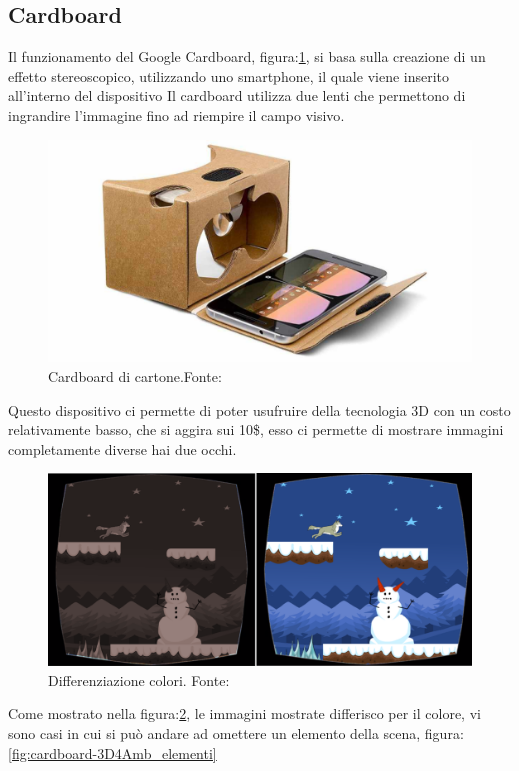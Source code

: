 \documentclass[
a4paper,
cleardoublepage=empty,
headings=twolinechapter,
numbers=autoenddot,
]{scrbook}
\begin{document}
	\subsection{Cardboard}\label{chap:cardboard}
    Il funzionamento del Google Cardboard, figura:\ref{fig:cardboard}, si basa sulla creazione di un effetto stereoscopico\cite{Stereoscopio}, utilizzando uno smartphone, il quale viene inserito all'interno del dispositivo
	Il cardboard utilizza due lenti che permettono di ingrandire l'immagine fino ad riempire il campo visivo\cite{Funzionamento_cardboard}.
	\begin{figure}[H]
		\centering
		\includegraphics[width=0.8\linewidth]{image/cardboard}
		\caption{Cardboard di cartone.Fonte:\cite{Cardboard_image}}
		\label{fig:cardboard}
	\end{figure}
	Questo dispositivo ci permette di poter usufruire della tecnologia 3D con un costo relativamente basso, che si aggira sui 10\$, esso ci permette di mostrare immagini completamente diverse hai due occhi.
	\begin{figure}[H]
		\centering
		\includegraphics[width=0.8\linewidth]{image/3D4Amb_1}
		\caption{Differenziazione colori.
			Fonte:\cite{3d4amb}}
		\label{fig:cardboard-3D4Amb_colori}
	\end{figure}
    Come mostrato nella figura:\ref{fig:cardboard-3D4Amb_colori}, le immagini mostrate differisco per il colore, vi sono casi in cui si può andare ad omettere un elemento della scena, figura:\ref{fig:cardboard-3D4Amb_elementi}
\end{document}

